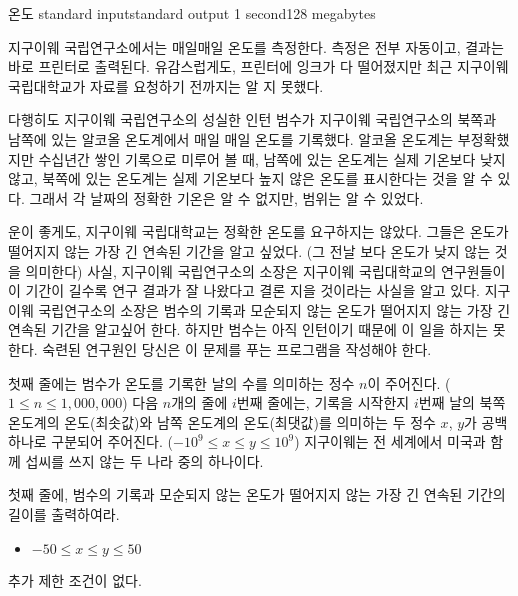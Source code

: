 \begin{problem}{온도}
	{standard input}{standard output}
	{1 second}{128 megabytes}{}
	
	

지구이웨 국립연구소에서는 매일매일 온도를 측정한다. 측정은 전부 자동이고, 결과는 바로 프린터로 출력된다. 유감스럽게도, 프린터에 잉크가 다 떨어졌지만 최근 지구이웨 국립대학교가 자료를 요청하기 전까지는 알 지 못했다.

다행히도 지구이웨 국립연구소의 성실한 인턴 범수가 지구이웨 국립연구소의 북쪽과 남쪽에 있는 알코올 온도계에서 매일 매일 온도를 기록했다. 알코올 온도계는 부정확했지만 수십년간 쌓인 기록으로 미루어 볼 때, 남쪽에 있는 온도계는 실제 기온보다 낮지 않고, 북쪽에 있는 온도계는 실제 기온보다 높지 않은 온도를 표시한다는 것을 알 수 있다. 그래서 각 날짜의 정확한 기온은 알 수 없지만, 범위는 알 수 있었다.


운이 좋게도, 지구이웨 국립대학교는 정확한 온도를 요구하지는 않았다. 그들은 온도가 떨어지지 않는 가장 긴 연속된 기간을 알고 싶었다. (그 전날 보다 온도가 낮지 않는 것을 의미한다) 사실, 지구이웨 국립연구소의 소장은 지구이웨 국립대학교의 연구원들이 이 기간이 길수록 연구 결과가 잘 나왔다고 결론 지을 것이라는 사실을 알고 있다. 지구이웨 국립연구소의 소장은 범수의 기록과 모순되지 않는 온도가 떨어지지 않는 가장 긴 연속된 기간을 알고싶어 한다. 하지만 범수는 아직 인턴이기 때문에 이 일을 하지는 못한다. 숙련된 연구원인 당신은 이 문제를 푸는 프로그램을 작성해야 한다.


	\InputFile
	
	첫째 줄에는 범수가 온도를 기록한 날의 수를 의미하는 정수 $n$이 주어진다. ($1 \le n \le 1,000,000$) 다음 $n$개의 줄에 $i$번째 줄에는, 기록을 시작한지 $i$번째 날의 북쪽 온도계의 온도(최솟값)와 남쪽 온도계의 온도(최댓값)를 의미하는 두 정수 $x$, $y$가 공백 하나로 구분되어 주어진다. ($-10^9 \le x \le y \le 10^9$) 지구이웨는 전 세계에서 미국과 함께 섭씨를 쓰지 않는 두 나라 중의 하나이다. 
	
	
	\OutputFile
	
	첫째 줄에, 범수의 기록과 모순되지 않는 온도가 떨어지지 않는 가장 긴 연속된 기간의 길이를 출력하여라.
	
	\begin{itemize}
		\item $-50 \le x \le y \le 50$
	\end{itemize}
	
	
	추가 제한 조건이 없다.
	
	\Examples
		
	\begin{example}
	\end{example}
	
	
        
\end{problem}


